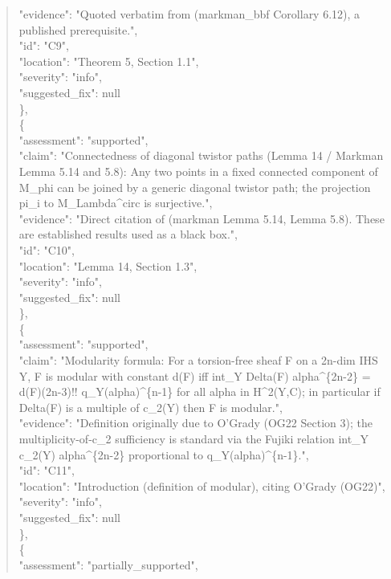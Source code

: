 \documentclass[11pt]{article}
\begin{document}
\begin{quote}
      "evidence": "Quoted verbatim from (markman\_bbf Corollary 6.12), a published prerequisite.",\\
      "id": "C9",\\
      "location": "Theorem 5, Section 1.1",\\
      "severity": "info",\\
      "suggested\_fix": null\\
    \},\\
    \{\\
      "assessment": "supported",\\
      "claim": "Connectedness of diagonal twistor paths (Lemma 14 / Markman Lemma 5.14 and 5.8): Any two points in a fixed connected component of M\_phi can be joined by a generic diagonal twistor path; the projection pi\_i to M\_Lambda\^{}circ is surjective.",\\
      "evidence": "Direct citation of (markman Lemma 5.14, Lemma 5.8). These are established results used as a black box.",\\
      "id": "C10",\\
      "location": "Lemma 14, Section 1.3",\\
      "severity": "info",\\
      "suggested\_fix": null\\
    \},\\
    \{\\
      "assessment": "supported",\\
      "claim": "Modularity formula: For a torsion-free sheaf F on a 2n-dim IHS Y, F is modular with constant d(F) iff int\_Y Delta(F) alpha\^{}\{2n-2\} = d(F)(2n-3)!! q\_Y(alpha)\^{}\{n-1\} for all alpha in H\^{}2(Y,C); in particular if Delta(F) is a multiple of c\_2(Y) then F is modular.",\\
      "evidence": "Definition originally due to O'Grady (OG22 Section 3); the multiplicity-of-c\_2 sufficiency is standard via the Fujiki relation int\_Y c\_2(Y) alpha\^{}\{2n-2\} proportional to q\_Y(alpha)\^{}\{n-1\}.",\\
      "id": "C11",\\
      "location": "Introduction (definition of modular), citing O'Grady (OG22)",\\
      "severity": "info",\\
      "suggested\_fix": null\\
    \},\\
    \{\\
      "assessment": "partially\_supported",\\

\end{quote}
\end{document}
